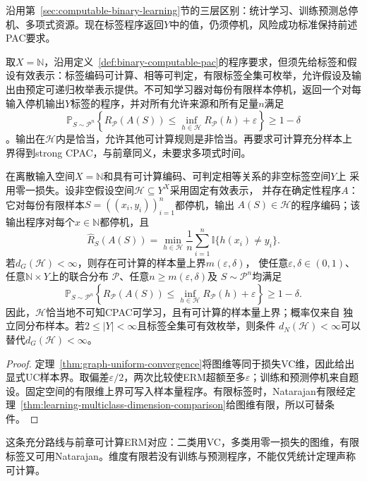 沿用第~\ref{sec:computable-binary-learning}节的三层区别：统计学习、训练预测总停机、多项式资源。现在标签程序返回$Y$中的值，仍须停机，风险成功标准保持前述PAC要求。

取$X=\mathbb N$，沿用定义~\ref{def:binary-computable-pac}的程序要求，但须先给标签和假设有效表示：标签编码可计算、相等可判定，有限标签全集可枚举，允许假设及输出由预定可递归枚举表示提供。不可知学习器对每份有限样本停机，返回一个对每输入停机输出$Y$标签的程序，并对所有允许来源和所有足量$n$满足
\[
 \mathbb P_{S\sim\mathcal P^n}\!\left\{
 R_{\mathcal P}(A(S))\leq\inf_{h\in\mathcal H}R_{\mathcal P}(h)+\varepsilon
 \right\}\geq1-\delta
\]
。输出在$\mathcal H$内是恰当，允许其他可计算规则是非恰当。再要求可计算充分样本上界得到strong CPAC，与前章同义，未要求多项式时间。

\begin{theorem}[多分类可计算ERM的充分条件]
\label{thm:multiclass-computable-erm}
在离散输入空间$X=\mathbb N$和具有可计算编码、可判定相等关系的非空标签空间$Y$上
采用零一损失。设非空假设空间$\mathcal H\subseteq Y^X$采用固定有效表示，
并存在确定性程序$A$：它对每份有限样本$S=((x_i,y_i))_{i=1}^n$都停机，输出
$A(S)\in\mathcal H$的程序编码；该输出程序对每个$x\in\mathbb N$都停机，且
\[
 \hat R_S(A(S))
 =\min_{h\in\mathcal H}\frac1n\sum_{i=1}^n\mathbb I\{h(x_i)\neq y_i\}.
\]
若$d_G(\mathcal H)<\infty$，则存在可计算的样本量上界$m(\varepsilon,\delta)$，
使任意$\varepsilon,\delta\in(0,1)$、任意$\mathbb N\times Y$上的联合分布
$\mathcal P$、任意$n\geq m(\varepsilon,\delta)$及
$S\sim\mathcal P^n$均满足
\[
 \mathbb P_{S\sim\mathcal P^n}\left\{
 R_{\mathcal P}(A(S))
 \leq\inf_{h\in\mathcal H}R_{\mathcal P}(h)+\varepsilon
 \right\}\geq1-\delta.
\]
因此，$\mathcal H$恰当地不可知CPAC可学习，且有可计算的样本量上界；概率仅来自
独立同分布样本。若$2\leq|Y|<\infty$且标签全集可有效枚举，则条件
$d_N(\mathcal H)<\infty$可以替代$d_G(\mathcal H)<\infty$。
\end{theorem}

\begin{proof}
定理~\ref{thm:graph-uniform-convergence}将图维等同于损失VC维，因此给出显式UC样本界。取偏差$\varepsilon/2$，两次比较使ERM超额至多$\varepsilon$；训练和预测停机来自题设。固定空间的有限维上界可写入样本量程序。有限标签时，Natarajan有限经定理~\ref{thm:learning-multiclass-dimension-comparison}给图维有限，所以可替条件。
\end{proof}

这条充分路线与前章可计算ERM对应：二类用VC，多类用零一损失的图维，有限标签又可用Natarajan。维度有限若没有训练与预测程序，不能仅凭统计定理声称可计算。

